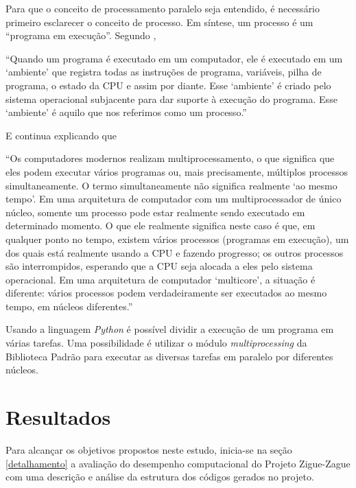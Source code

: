 \documentclass[12pt]{article}
\newcommand{\aspas}[1]{``#1''} %
\newcommand{\citacao}[1]{
	\singlespacing %
	\begin{flushright}
		\begin{minipage}{0.75\linewidth} %
			{\fontsize{10}{\baselineskip}\selectfont \aspas{#1}}
		\end{minipage}
	\end{flushright}
	\onehalfspacing %
}
\begin{document}
Para que o conceito de processamento paralelo seja entendido, é necessário primeiro esclarecer o conceito de processo. Em síntese, um processo é um \aspas{programa em execução}. Segundo \cite{perkovic:2016},

\citacao{Quando um programa é executado em um computador, ele é executado em um `ambiente' que registra todas as instruções de programa, variáveis, pilha de programa, o estado da CPU e assim por diante. Esse `ambiente' é criado pelo sistema operacional subjacente para dar suporte à execução do programa. Esse `ambiente' é aquilo que nos referimos como um processo.}

\noindent E continua explicando que 

\citacao{Os computadores modernos realizam multiprocessamento, o que significa que eles podem executar vários
	programas ou, mais precisamente, múltiplos processos simultaneamente. O termo simultaneamente não significa realmente `ao mesmo tempo'. Em uma arquitetura de computador com um multiprocessador de único núcleo, somente
	um processo pode estar realmente sendo executado em determinado momento. O que ele realmente significa neste
	caso é que, em qualquer ponto no tempo, existem vários processos (programas em execução), um dos quais está
	realmente usando a CPU e fazendo progresso; os outros processos são interrompidos, esperando que a CPU seja
	alocada a eles pelo sistema operacional. Em uma arquitetura de computador `multicore', a situação é diferente: vários
	processos podem verdadeiramente ser executados ao mesmo tempo, em núcleos diferentes.}

Usando a linguagem \textit{Python} é possível dividir a execução de um programa em várias tarefas. Uma possibilidade é utilizar o módulo \textit{multiprocessing} da Biblioteca Padrão para executar as diversas tarefas em paralelo por diferentes núcleos.


\section{Resultados}

Para alcançar os objetivos propostos neste estudo, inicia-se na seção \ref{detalhamento} a avaliação do desempenho computacional do Projeto Zigue-Zague com uma descrição e análise da estrutura dos códigos gerados no projeto.
\end{document}

